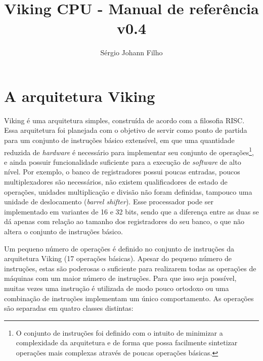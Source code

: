 \documentclass{extreport}
\begin{document}
\pagestyle{empty}
\title{\textbf{Viking CPU - Manual de referência v0.4}}
\author{Sérgio Johann Filho}

\maketitle


\renewcommand{\cftchapdotsep}{\cftdotsep}
\tableofcontents

\pagestyle{fancy}
\fancyhf{}
\lhead[]{\thepage}
\rhead[\thepage]{}
\onehalfspacing


\newpage
\thispagestyle{empty}

\chapter{A arquitetura Viking}
Viking é uma arquitetura simples, construída de acordo com a filosofia RISC. Essa arquitetura foi planejada com o objetivo de servir como ponto de partida para um conjunto de instruções básico extensível, em que uma quantidade reduzida de \textit{hardware} é necessário para implementar seu conjunto de operações\footnote{O conjunto de instruções foi definido com o intuito de minimizar a complexidade da arquitetura e de forma que possa facilmente sintetizar operações mais complexas através de poucas operações básicas.}, e ainda possuir funcionalidade suficiente para a execução de \textit{software} de alto nível. Por exemplo, o banco de registradores possui poucas entradas, poucos multiplexadores são necessários, não existem qualificadores de estado de operações, unidades multiplicação e divisão não foram definidas, tampouco uma unidade de deslocamento (\textit{barrel shifter}). Esse processador pode ser implementado em variantes de 16 e 32 bits, sendo que a diferença entre as duas se dá apenas com relação ao tamanho dos registradores do seu banco, o que não altera o conjunto de instruções básico.

Um pequeno número de operações é definido no conjunto de instruções da arquitetura Viking (17 operações básicas). Apesar do pequeno número de instruções, estas são poderosas o suficiente para realizarem todas as operações de máquinas com um maior número de instruções. Para que isso seja possível, muitas vezes uma instrução é utilizada de modo pouco ortodoxo ou uma combinação de instruções implementam um único comportamento. As operações são separadas em quatro classes distintas:
\end{document}
